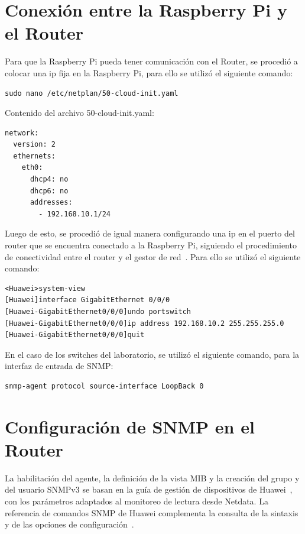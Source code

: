 \section{Conexión entre la Raspberry Pi y el Router}


Para que la Raspberry Pi pueda tener comunicación con el Router, se procedió a colocar una ip fija en la Raspberry Pi, para ello se utilizó el siguiente comando:
\begin{lstlisting}[style=terminal]
sudo nano /etc/netplan/50-cloud-init.yaml

\end{lstlisting}

Contenido del archivo 50-cloud-init.yaml:

\begin{lstlisting}[style=terminal]
network:
  version: 2
  ethernets:
    eth0:
      dhcp4: no
      dhcp6: no
      addresses:
        - 192.168.10.1/24

\end{lstlisting}

Luego de esto, se procedió de igual manera configurando una ip en el puerto del router que se encuentra conectado a la Raspberry Pi, siguiendo el procedimiento de conectividad entre el router y el gestor de red~\cite[sec.~1.4.2, paso~1]{huawei-gestion-snmp}. Para ello se utilizó el siguiente comando:
\begin{lstlisting}[style=terminal]
<Huawei>system-view
[Huawei]interface GigabitEthernet 0/0/0
[Huawei-GigabitEthernet0/0/0]undo portswitch
[Huawei-GigabitEthernet0/0/0]ip address 192.168.10.2 255.255.255.0
[Huawei-GigabitEthernet0/0/0]quit

\end{lstlisting}

En el caso de los switches del laboratorio, se utilizó el siguiente comando, para la interfaz de entrada de SNMP:
\begin{lstlisting}[style=terminal]
snmp-agent protocol source-interface LoopBack 0
\end{lstlisting}


\section{Configuración de SNMP en el Router}

La habilitación del agente, la definición de la vista MIB y la creación del
grupo y del usuario SNMPv3 se basan en la guía de gestión de dispositivos de
Huawei~\cite[sec.~1.4.2]{huawei-gestion-snmp}, con los parámetros adaptados al
monitoreo de lectura desde Netdata. La referencia de comandos SNMP de
Huawei complementa la consulta de la sintaxis y de las opciones de
configuración~\cite{huawei_snmp_2026}.

